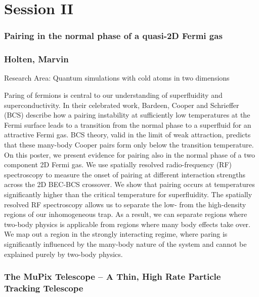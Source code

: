\chapter*{Session II}
\subsection*{\centering \large Pairing in the normal phase of a quasi-2D Fermi gas}
\subsection*{\centering \normalsize Holten, Marvin}
Research Area: Quantum simulations with cold atoms in two dimensions\newline

\noindent Paring of fermions is central to our understanding of superfluidity and superconductivity. In their celebrated work, Bardeen, Cooper and Schrieffer (BCS) describe how a pairing instability at sufficiently low temperatures at the Fermi surface leads to a transition from the normal phase to a superfluid for an attractive Fermi gas. BCS theory, valid in the limit of weak attraction, predicts that these many-body Cooper pairs form only below the transition temperature.
On this poster, we present evidence for pairing also in the normal phase of a two component 2D Fermi gas. We use spatially resolved radio-frequency (RF) spectroscopy to measure the onset of pairing at different interaction strengths across the 2D BEC-BCS crossover. We show that pairing occurs at temperatures significantly higher than the critical temperature for superfluidity. The spatially resolved RF spectroscopy allows us to separate the low- from the high-density regions of our inhomogeneous trap. As a result, we can separate regions where two-body physics is applicable from regions where many body effects take over. We map out a region in the strongly interacting regime, where paring is significantly influenced by the many-body nature of the system and cannot be explained purely by two-body physics.
\newpage

\subsection*{\centering \large  The MuPix Telescope – A Thin, High Rate Particle Tracking Telescope }
